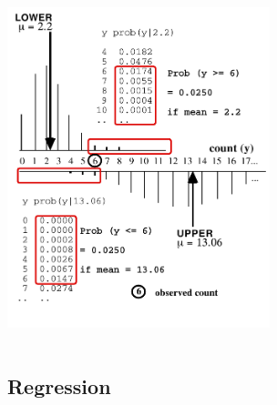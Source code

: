\documentclass[10pt]{beamer}\usepackage[]{graphicx}\usepackage[]{color}
\begin{document}
\begin{frame}
	\centering
	\includegraphics[width=3in,height=4in]{CI_Poisson(6).pdf}
\end{frame}


\subsection{Regression}

\begin{frame}
\end{frame}
\end{document}

